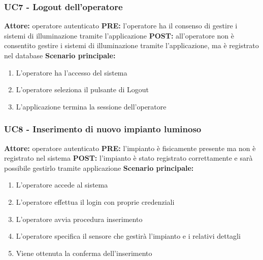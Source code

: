\documentclass[a4paper, 12pt]{article}
\begin{document}
\subsubsection{UC7 - Logout dell'operatore}
\textbf{Attore:} operatore autenticato\newline
\textbf{PRE:} l'operatore ha il consenso di gestire i sistemi di illuminazione tramite l'applicazione\newline
\textbf{POST:} all'operatore non è consentito gestire i sistemi di illuminazione tramite l'applicazione, ma è registrato nel database\newline
\textbf{Scenario principale:}
\begin{enumerate}
    \item L'operatore ha l'accesso del sistema
    \item L'operatore seleziona il pulsante di Logout
    \item L'applicazione termina la sessione dell'operatore
\end{enumerate}

\subsubsection{UC8 - Inserimento di nuovo impianto luminoso}
\textbf{Attore:} operatore autenticato\newline
\textbf{PRE:} l'impianto è fisicamente presente ma non è registrato nel sistema\newline
\textbf{POST:} l'impianto è stato registrato correttamente e sarà possibile gestirlo tramite applicazione\newline
\textbf{Scenario principale:}
\begin{enumerate}
    \item L'operatore accede al sistema
    \item L'operatore effettua il login con proprie credenziali
    \item L'operatore avvia procedura inserimento
    \item L'operatore specifica il sensore che gestirà l'impianto e i relativi dettagli
    \item Viene ottenuta la conferma dell'inserimento
\end{enumerate}
\end{document}
